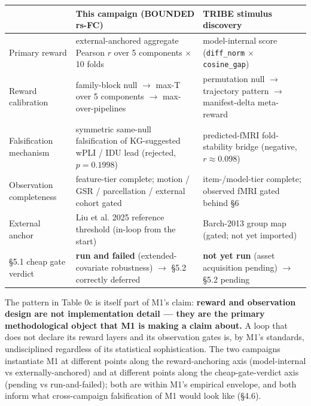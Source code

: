 \documentclass[11pt,letterpaper]{report}
\begin{document}
{}
\begin{center}
\small
\setlength{\tabcolsep}{4pt}
\renewcommand{\arraystretch}{1.15}
\begin{tabularx}{\textwidth}{@{}>{\raggedright\arraybackslash}p{}>{\raggedright\arraybackslash}X>{\raggedright\arraybackslash}X@{}}
\toprule
\textbf{} & \textbf{This campaign (BOUNDED rs-FC)} & \textbf{TRIBE stimulus discovery} \\
\midrule
Primary reward & external-anchored aggregate Pearson $r$ over 5 components $\times$ 10 folds & model-internal score (\texttt{diff\_norm} $\times$ \texttt{cosine\_gap}) \\
\midrule
Reward calibration & family-block null $\rightarrow$ max-T over 5 components $\rightarrow$ max-over-pipelines & permutation null $\rightarrow$ trajectory pattern $\rightarrow$ manifest-delta meta-reward \\
\midrule
Falsification mechanism & symmetric same-null falsification of KG-suggested wPLI / IDU lead (rejected, $p = 0.1998$) & predicted-fMRI fold-stability bridge (negative, $r \approx 0.098$) \\
\midrule
Observation completeness & feature-tier complete; motion / GSR / parcellation / external cohort gated & item-/model-tier complete; observed fMRI gated behind \S6 \\
\midrule
External anchor & Liu et al. 2025 reference threshold (in-loop from the start) & Barch-2013 group map (gated; not yet imported) \\
\midrule
\S5.1 cheap gate verdict & \textbf{run and failed} (extended-covariate robustness) $\rightarrow$ \S5.2 correctly deferred & \textbf{not yet run} (asset acquisition pending) $\rightarrow$ \S5.2 pending \\
\bottomrule
\end{tabularx}
\end{center}

The pattern in Table 0c is itself part of M1's claim: \textbf{reward and observation design are not implementation detail --- they are the primary methodological object that M1 is making a claim about.} A loop that does not declare its reward layers and its observation gates is, by M1's standards, undisciplined regardless of its statistical sophistication. The two campaigns instantiate M1 at different points along the reward-anchoring axis (model-internal vs externally-anchored) and at different points along the cheap-gate-verdict axis (pending vs run-and-failed); both are within M1's empirical envelope, and both inform what cross-campaign falsification of M1 would look like (\S4.6).
\end{document}

